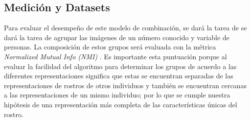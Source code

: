 \documentclass[letterpaper, 10 pt, conference]{ieeeconf}  %
\begin{document}
    \subsection{Medición y Datasets}
    Para evaluar el desempeño de este modelo de combinación, se dará la tarea de se dará la
    tarea de agrupar las imágenes de un número conocido y variable de personas. La composición
    de estos grupos será evaluada con la métrica \textit{Normalized Mutual Info (NMI)}
    \cite{NMI}. Es importante esta puntuación porque al evaluar la facilidad del algoritmo para
    determinar los grupos de acuerdo a las diferentes representaciones significa que estas se
    encuentran separadas de las representaciones de rostros de otros individuos y también se
    encuentran cercanas a las representaciones de un mismo individuo; por lo que se cumple
    nuestra hipótesis de una representación más completa de las características únicas del
    rostro.
\end{document}
